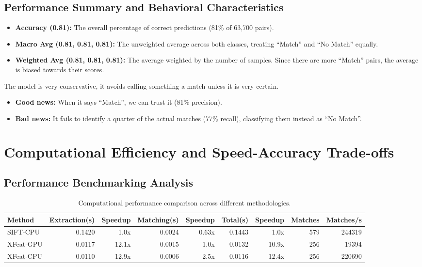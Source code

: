 \subsection{Performance Summary and Behavioral Characteristics}

\begin{itemize}
    \item \textbf{Accuracy (0.81):} The overall percentage of correct predictions (81\% of 63,700 pairs).
    \item \textbf{Macro Avg (0.81, 0.81, 0.81):} The unweighted average across both classes, treating ``Match'' and ``No Match'' equally.
    \item \textbf{Weighted Avg (0.81, 0.81, 0.81):} The average weighted by the number of samples. Since there are more ``Match'' pairs, the average is biased towards their scores.
\end{itemize}

The model is very conservative, it avoids calling something a match unless it
is very certain.

\begin{itemize}
    \item \textbf{Good news:} When it says ``Match'', we can trust it (81\% precision).
    \item \textbf{Bad news:} It fails to identify a quarter of the actual matches (77\% recall), classifying them instead as ``No Match''.
\end{itemize}

\section{Computational Efficiency and Speed-Accuracy Trade-offs}

\subsection{Performance Benchmarking Analysis}

\begin{table}[H]
    \centering
    \caption{Computational performance comparison across different methodologies.}
    \label{tab:speed_comparison}
    \begin{tabular}{l r r r r r r r r}
        \toprule
        Method    & Extraction(s) & Speedup & Matching(s) & Speedup & Total(s) & Speedup & Matches & Matches/s \\
        \midrule
        SIFT-CPU  & 0.1420        & 1.0x    & 0.0024      & 0.63x   & 0.1443   & 1.0x    & 579     & 244319    \\
        XFeat-GPU & 0.0117        & 12.1x   & 0.0015      & 1.0x    & 0.0132   & 10.9x   & 256     & 19394     \\
        XFeat-CPU & 0.0110        & 12.9x   & 0.0006      & 2.5x    & 0.0116   & 12.4x   & 256     & 220690    \\
        \bottomrule
    \end{tabular}
\end{table}

